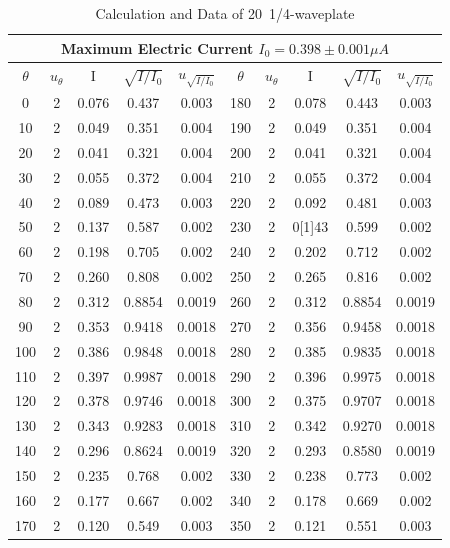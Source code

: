 \documentclass[12pt,a4paper]{article}
\begin{document}
\begin{table}[H]
    \centering
    \begin{tabular}{|c|c|c|c|c|c|c|c|c|c|}
    \hline
    \multicolumn{10}{|c|}{Maximum Electric Current $I_0=0.398±0.001\mu A$}       \\ \hline
    $\theta$ & $u_\theta$ &I& $\sqrt{I/I_0}$ & $u_{\sqrt{I/I_0}}$ &$\theta$ & $u_\theta$ &I& $\sqrt{I/I_0}$ & $u_{\sqrt{I/I_0}}$      \\  \hline
    0     & 2 & 0.076 & 0.437  & 0.003  & 180   & 2 & 0.078 & 0.443  & 0.003  \\ \hline
    10    & 2 & 0.049 & 0.351  & 0.004  & 190   & 2 & 0.049 & 0.351  & 0.004  \\ \hline
    20    & 2 & 0.041 & 0.321  & 0.004  & 200   & 2 & 0.041 & 0.321  & 0.004  \\ \hline
    30    & 2 & 0.055 & 0.372  & 0.004  & 210   & 2 & 0.055 & 0.372  & 0.004  \\ \hline
    40    & 2 & 0.089 & 0.473  & 0.003  & 220   & 2 & 0.092 & 0.481  & 0.003  \\ \hline
    50    & 2 & 0.137 & 0.587  & 0.002  & 230   & 2 & 0[1]43 & 0.599  & 0.002  \\ \hline
    60    & 2 & 0.198 & 0.705  & 0.002  & 240   & 2 & 0.202 & 0.712  & 0.002  \\ \hline
    70    & 2 & 0.260  & 0.808  & 0.002  & 250   & 2 & 0.265 & 0.816  & 0.002  \\ \hline
    80    & 2 & 0.312 & 0.8854 & 0.0019 & 260   & 2 & 0.312 & 0.8854 & 0.0019 \\ \hline
    90    & 2 & 0.353 & 0.9418 & 0.0018 & 270   & 2 & 0.356 & 0.9458 & 0.0018 \\ \hline
    100   & 2 & 0.386 & 0.9848 & 0.0018 & 280   & 2 & 0.385 & 0.9835 & 0.0018 \\ \hline
    110   & 2 & 0.397 & 0.9987 & 0.0018 & 290   & 2 & 0.396 & 0.9975 & 0.0018 \\ \hline
    120   & 2 & 0.378 & 0.9746 & 0.0018 & 300   & 2 & 0.375 & 0.9707 & 0.0018 \\ \hline
    130   & 2 & 0.343 & 0.9283 & 0.0018 & 310   & 2 & 0.342 & 0.9270 & 0.0018 \\ \hline
    140   & 2 & 0.296 & 0.8624 & 0.0019 & 320   & 2 & 0.293 & 0.8580 & 0.0019 \\ \hline
    150   & 2 & 0.235 & 0.768  & 0.002  & 330   & 2 & 0.238 & 0.773  & 0.002  \\ \hline
    160   & 2 & 0.177 & 0.667  & 0.002  & 340   & 2 & 0.178 & 0.669  & 0.002  \\ \hline
    170   & 2 & 0.120  & 0.549  & 0.003  & 350   & 2 & 0.121 & 0.551  & 0.003  \\ \hline
    \end{tabular}
    \caption{Calculation and Data of 20\degree~1/4-waveplate}
    \label{20degree}
\end{table}
\end{document}
